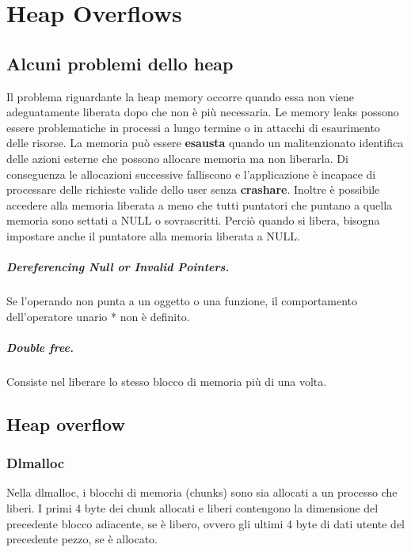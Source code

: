 \chapter{Heap Overflows}
\section{Alcuni problemi dello heap}
Il problema riguardante la heap memory occorre quando essa non viene adeguatamente liberata
dopo che non è più necessaria. Le memory leaks possono essere problematiche in processi a lungo termine
o in attacchi di esaurimento delle risorse. La memoria può essere \textbf{esausta} quando un malitenzionato identifica delle azioni esterne che possono allocare memoria ma non liberarla. Di conseguenza le allocazioni successive  falliscono e l'applicazione è incapace di processare delle richieste valide dello user senza \textbf{crashare}. Inoltre è possibile accedere alla memoria liberata a meno che tutti puntatori che puntano a quella memoria sono settati a NULL o sovrascritti. Perciò quando si libera, bisogna impostare anche il puntatore alla memoria liberata a NULL.

\paragraph{Dereferencing Null or Invalid Pointers.} Se l'operando non punta a un oggetto o una funzione, il comportamento dell'operatore unario * non è definito.

\paragraph{Double free.} Consiste nel liberare lo stesso blocco di memoria più di una volta.

\section{Heap overflow}
\subsection{Dlmalloc}
Nella dlmalloc, i blocchi di memoria (chunks) sono sia allocati a un processo che liberi. I primi 4 byte dei chunk allocati e liberi contengono la dimensione del precedente blocco adiacente, se è libero, ovvero gli ultimi 4 byte di dati utente del precedente pezzo, se è allocato.

